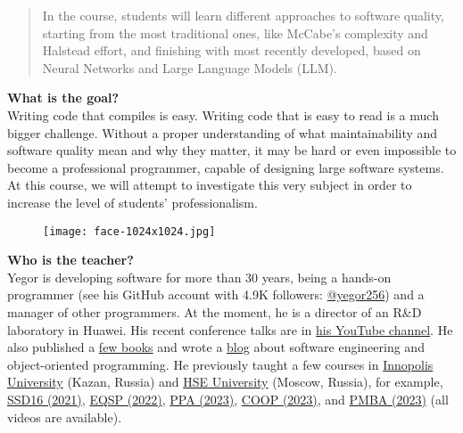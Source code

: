 \documentclass[nobrand,anonymous,nodate,nosecurity]{huawei}
\def\SqmEnglish{}
\begin{document}
\newcommand\angry[1]{\textcolor{red}{#1}}


\ifdefined\SqmEnglish
{

\begin{abstract}
In the course, students will learn different approaches to software quality,
starting from the most traditional ones, like McCabe's complexity and
Halstead effort, and finishing with most recently developed, based on Neural Networks
and Large Language Models (LLM).
\end{abstract}

\textbf{What is the goal?}\\
Writing code that compiles is easy. Writing code that is easy to read
is a much bigger challenge. Without a proper understanding of what maintainability
and software quality mean and why they matter, it may be hard or even impossible
to become a professional programmer, capable of designing large software systems.
At this course, we will attempt to investigate this very subject
in order to increase the level of students' professionalism.

\begin{wrapfigure}{r}{1.2in}%
\raggedleft%
\texttt{[image: face-1024x1024.jpg]}%
\end{wrapfigure}
\textbf{Who is the teacher?}\\
Yegor is developing software for more than 30 years, being a hands-on programmer
(see his GitHub account with 4.9K followers: \href{https://github.com/yegor256}{@yegor256})
and a manager of other programmers. At the moment, he is a director
of an R\&D laboratory in Huawei. His recent conference talks are in
\href{https://www.youtube.com/channel/UCr9qCdqXLm2SU0BIs6d_68Q}{his YouTube channel}.
He also published a \href{https://www.yegor256.com/books.html}{few books}
and wrote a \href{https://www.yegor256.com/contents.html}{blog} about software engineering
and object-oriented programming.
He previously taught a few courses in
\href{https://innopolis.university/}{Innopolis University} (Kazan, Russia)
and
\href{https://hse.ru}{HSE University} (Moscow, Russia),
for example,
\href{https://github.com/yegor256/ssd16}{SSD16 (2021)},
\href{https://github.com/yegor256/eqsp}{EQSP (2022)},
\href{https://github.com/yegor256/ppa}{PPA (2023)},
\href{https://github.com/yegor256/painofoop}{COOP (2023)},
and
\href{https://github.com/yegor256/pmba}{PMBA (2023)}
(all videos are available).

}
\end{document}
